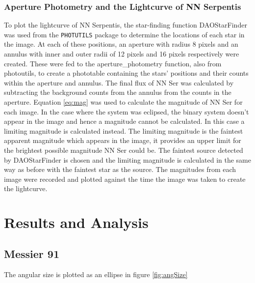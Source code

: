 \documentclass[%
reprint,
amsmath,amssymb,
aps,
]{revtex4-2}
\begin{document}
			\subsubsection{Aperture Photometry and the Lightcurve of NN Serpentis}
				To plot the lightcurve of NN Serpentis, the star-finding function DAOStarFinder was used from the \texttt{PHOTUTILS} package to determine the locations of each star in the image. At each of these positions, an aperture with radius 8 pixels and an annulus with inner and outer radii of 12 pixels and 16 pixels respectively were created. These were fed to the aperture\_photometry function, also from photoutils, to create a phototable containing the stars' positions and their counts within the aperture and annulus. The final flux of NN Ser was calculated by subtracting the background counts from the annulus from the counts in the aperture. Equation \ref{eq:mag} was used to calculate the magnitude of NN Ser for each image. In the case where the system was eclipsed, the binary system doesn't appear in the image and hence a magnitude cannot be calculated. In this case a limiting magnitude is calculated instead. The limiting magnitude is the faintest apparent magnitude which appears in the image\cite{manual}, it provides an upper limit for the brightest possible magnitude NN Ser could be. The faintest source detected by DAOStarFinder is chosen and the limiting magnitude is calculated in the same way as before with the faintest star as the source. The magnitudes from each image were recorded and plotted against the time the image was taken to create the lightcurve.
		
	\section{Results and Analysis}
	
		\subsection{Messier 91}
		
			The angular size is plotted as an ellipse in figure \ref{fig:angSize}
			
\end{document}
